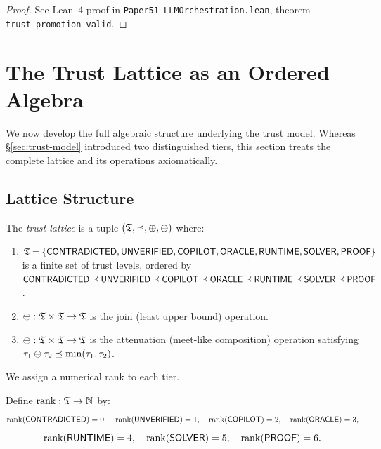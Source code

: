 \documentclass[11pt]{article}
\newcommand{\trank}{\mathrm{rank}}
\begin{document}
\begin{proof}
See Lean~4 proof in \texttt{Paper51\_LLMOrchestration.lean}, theorem 
\texttt{trust\_promotion\_valid}.
\end{proof}

\section{The Trust Lattice as an Ordered Algebra}\label{sec:trust-lattice}

We now develop the full algebraic structure underlying the trust model.
Whereas \S\ref{sec:trust-model} introduced two distinguished tiers,
this section treats the complete lattice and its operations axiomatically.

\subsection{Lattice Structure}

\begin{definition}\label{def:trust-lattice}
The \emph{trust lattice} is a tuple $(\mathfrak{T}, \preceq, \oplus, \ominus)$ where:
\begin{enumerate}[noitemsep]
  \item $\mathfrak{T} = \{\mathsf{CONTRADICTED}, \mathsf{UNVERIFIED}, \mathsf{COPILOT}, \mathsf{ORACLE}, \mathsf{RUNTIME},
        \mathsf{SOLVER}, \mathsf{PROOF}\}$ is a finite set of trust levels, ordered by
        $\mathsf{CONTRADICTED} \preceq \mathsf{UNVERIFIED} \preceq \mathsf{COPILOT} \preceq \mathsf{ORACLE} \preceq
        \mathsf{RUNTIME} \preceq \mathsf{SOLVER} \preceq \mathsf{PROOF}$.
  \item $\oplus : \mathfrak{T} \times \mathfrak{T} \to \mathfrak{T}$ is the join (least upper
        bound) operation.
  \item $\ominus : \mathfrak{T} \times \mathfrak{T} \to \mathfrak{T}$ is the attenuation
        (meet-like composition) operation satisfying
        $\tau_1 \ominus \tau_2 \preceq \min(\tau_1, \tau_2)$.
\end{enumerate}
\end{definition}

We assign a numerical rank to each tier.

\begin{definition}\label{def:rank}
Define $\trank : \Talg \to \mathbb{N}$ by:
\[
  \trank(\Tcontra) = 0, \quad
  \trank(\Tunver) = 1, \quad
  \trank(\Tcopilot) = 2, \quad
  \trank(\Toracle) = 3,
\]
\[
  \trank(\Truntime) = 4, \quad
  \trank(\Tsolver) = 5, \quad
  \trank(\Tproof) = 6.
\]
\end{definition}
\end{document}

